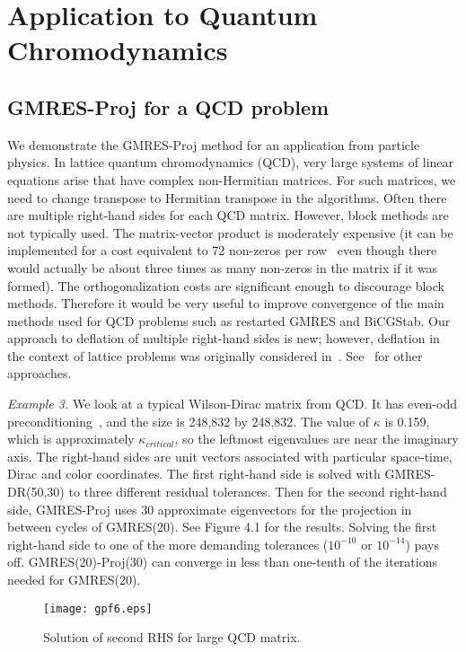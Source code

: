 \documentclass[final]{siamltex}
\begin{document}
\section{Application to Quantum Chromodynamics}

\subsection{GMRES-Proj for a QCD problem}

We demonstrate the GMRES-Proj method for an application from particle physics.  In lattice quantum chromodynamics (QCD), very large systems of linear equations arise that have complex non-Hermitian matrices.  For such matrices, we need to change transpose to Hermitian transpose in the algorithms.  Often there are multiple right-hand sides for each QCD matrix.  However, block methods are not typically used.  The matrix-vector product is moderately expensive (it can be implemented for a cost equivalent to 72 non-zeros per row~\cite{FrMe} even though there would actually be about three times as many non-zeros in the matrix if it was formed).  The orthogonalization costs are significant enough to discourage block methods.  Therefore it would be very useful to improve convergence of the main methods used  for QCD problems such as restarted GMRES and BiCGStab.  Our approach to deflation of multiple right-hand sides is new; however, deflation in the context of lattice problems was originally considered in~\cite{dF}.  See~\cite{EdHeNa,DoLeLiZh,NeEiLiNeSc} for other approaches.  

{\it Example 3.}
We look at a typical Wilson-Dirac matrix from QCD.  It has even-odd preconditioning~\cite{Qcdconf}, and the size is 248,832 by 248,832.  The value of $\kappa$ is 0.159, which is approximately $\kappa_{critical}$, so the leftmost eigenvalues are near the imaginary axis.  The right-hand sides are unit vectors associated with particular space-time, Dirac and color coordinates.  The first right-hand side is solved with GMRES-DR(50,30) to three different residual tolerances.  Then for the second right-hand side, GMRES-Proj uses 30 approximate eigenvectors for the projection in between cycles of GMRES(20).  See Figure 4.1 for the results.  Solving the first right-hand side to one of the more demanding tolerances ($10^{-10}$ or $10^{-14}$) pays off.  GMRES(20)-Proj(30) can converge in less than one-tenth of the iterations needed for GMRES(20).   

\begin{figure}
\vspace{.10in}
\begin{center}
\texttt{[image: gpf6.eps]}
\end{center}
\vspace{.10in}
\caption{Solution of second RHS for large QCD matrix.}
\end{figure}
\end{document}
